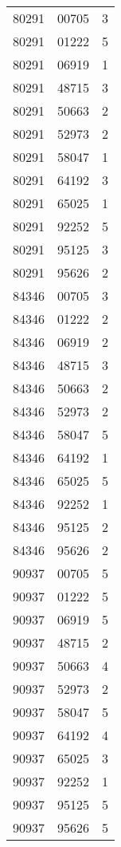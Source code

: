 {{\begin{tabular}{|c|c|c|}
80291&00705&3\\ 80291&01222&5\\ 80291&06919&1\\ 80291&48715&3\\ 80291&50663&2\\ 80291&52973&2\\ 80291&58047&1\\ 80291&64192&3\\ 80291&65025&1\\ 80291&92252&5\\ 80291&95125&3\\ 80291&95626&2\\ 84346&00705&3\\ 84346&01222&2\\ 84346&06919&2\\ 84346&48715&3\\ 84346&50663&2\\ 84346&52973&2\\ 84346&58047&5\\ 84346&64192&1\\ 84346&65025&5\\ 84346&92252&1\\ 84346&95125&2\\ 84346&95626&2\\ 90937&00705&5\\ 90937&01222&5\\ 90937&06919&5\\ 90937&48715&2\\ 90937&50663&4\\ 90937&52973&2\\ 90937&58047&5\\ 90937&64192&4\\ 90937&65025&3\\ 90937&92252&1\\ 90937&95125&5\\ 90937&95626&5\\ 
		\hline
		\end{tabular}
	}
}

